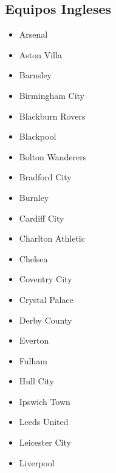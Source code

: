 \subsection{Equipos Ingleses}\label{sec:equipos-eng}
\begin{multicols}{2}
	\begin{itemize}
	    \setlength{\itemsep}{1pt}
	    \setlength{\parskip}{0pt}
	    \setlength{\parsep}{0pt}

	\item Arsenal

		\item Aston Villa

		\item Barnsley

		\item Birmingham City

		\item Blackburn Rovers

		\item Blackpool

		\item Bolton Wanderers

		\item Bradford City

		\item Burnley

		\item Cardiff City

		\item Charlton Athletic

		\item Chelsea

		\item Coventry City

		\item Crystal Palace

		\item Derby County

		\item Everton

		\item Fulham

		\item Hull City

		\item Ipswich Town

		\item Leeds United

		\item Leicester City

		\item Liverpool


\end{itemize}
\end{multicols}
